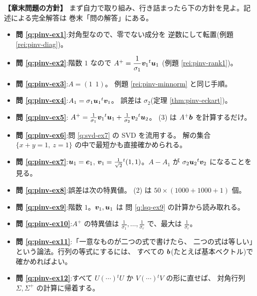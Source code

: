 \bigskip
{\small
\noindent\textbf{【章末問題の方針】}\quad
まず自力で取り組み、行き詰まったら下の方針を見よ。記述による完全解答は
巻末「問の解答」にある。
\begin{itemize}
\item \textbf{問 \ref{q:pinv-ex1}}:対角型なので、零でない成分を
逆数にして転置(例題 \ref{rei:pinv-diag})。
\item \textbf{問 \ref{q:pinv-ex2}}:階数 $1$ なので
$A^{+} = \dfrac{1}{\sigma_1}\bm{v}_1{}^t\bm{u}_1$
(例題 \ref{rei:pinv-rank1})。
\item \textbf{問 \ref{q:pinv-ex3}}:$A = (1\ \ 1)$。
例題 \ref{rei:pinv-minnorm} と同じ手順。
\item \textbf{問 \ref{q:pinv-ex4}}:$A_1 = \sigma_1\bm{u}_1{}^t\bm{v}_1$。
誤差は $\sigma_2$(定理 \ref{thm:pinv-eckart})。
\item \textbf{問 \ref{q:pinv-ex5}}:
$A^{+} = \frac{1}{\sigma_1}\bm{v}_1{}^t\bm{u}_1 +
\frac{1}{\sigma_2}\bm{v}_2{}^t\bm{u}_2$。
(3) は $A^{+}\bm{b}$ を計算するだけ。
\item \textbf{問 \ref{q:pinv-ex6}}:問 \ref{q:svd-ex7} の SVD を流用する。
解の集合 $\{x + y = 1,\ z = 1\}$ の中で最短かも直接確かめられる。
\item \textbf{問 \ref{q:pinv-ex7}}:$\bm{u}_1 = \bm{e}_1$,
$\bm{v}_1 = \frac{1}{\sqrt{2}}{}^t(1,1)$。$A - A_1$ が
$\sigma_2\bm{u}_2{}^t\bm{v}_2$ になることを見る。
\item \textbf{問 \ref{q:pinv-ex8}}:誤差は次の特異値。
(2) は $50 \times (1000 + 1000 + 1)$ 個。
\item \textbf{問 \ref{q:pinv-ex9}}:階数 $1$。$\bm{v}_1, \bm{u}_1$ は
問 \ref{q:lsq-ex9} の計算から読み取れる。
\item \textbf{問 \ref{q:pinv-ex10}}:$A^{+}$ の特異値は
$\frac{1}{\sigma_1}, \dots, \frac{1}{\sigma_r}$ で、最大は
$\frac{1}{\sigma_r}$。
\item \textbf{問 \ref{q:pinv-ex11}}:「一意なものが二つの式で書けたら、
二つの式は等しい」という論法。行列の等式にするには、
すべての $\bm{b}$(たとえば基本ベクトル)で確かめればよい。
\item \textbf{問 \ref{q:pinv-ex12}}:すべて
$U(\cdots){}^tU$ か $V(\cdots){}^tV$ の形に直せば、
対角行列 $\Sigma, \Sigma^{+}$ の計算に帰着する。
\end{itemize}
}
